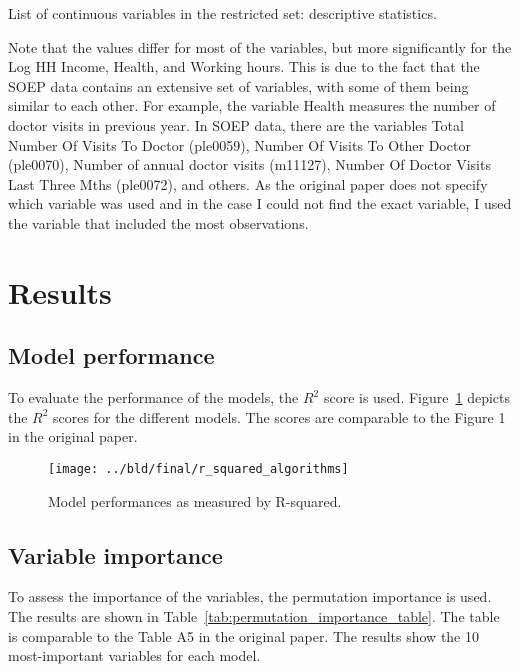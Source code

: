 \documentclass[11pt, a4paper, leqno]{article}
\begin{document}
\begin{table}[htbp]
    \centering
    
    \caption{List of continuous variables in the restricted set: descriptive statistics.}
    \label{tab:descriptive_stats_continuous}
\end{table}


Note that the values differ for most of the variables, but more significantly for the Log HH Income,
Health, and Working hours. This is due to the fact that the SOEP data contains an extensive
set of variables, with some of them being similar to each other. For example, the variable Health
measures the number of doctor visits in previous year. In SOEP data, there are the variables
Total Number Of Visits To Doctor (ple0059), Number Of Visits To Other Doctor (ple0070), Number of
annual doctor visits (m11127), Number Of Doctor Visits Last Three Mths (ple0072), and others.
As the original paper does not specify which variable was used and in the case I could not find
the exact variable, I used the variable that included the most observations.



\section{Results} %
\label{sec:results}

\subsection{Model performance}

To evaluate the performance of the models, the $R^2$ score is used. Figure~\ref{fig:r_squared_algorithms}
depicts the $R^2$ scores for the different models. The scores are comparable to the Figure 1 in the
original paper.

\begin{figure}[htbp]
    \centering
    \texttt{[image: ../bld/final/r\_squared\_algorithms]}
    \caption{Model performances as measured by R-squared.}
    \label{fig:r_squared_algorithms}
\end{figure}


\subsection{Variable importance}

To assess the importance of the variables, the permutation importance is used. The results are
shown in Table~\ref{tab:permutation_importance_table}. The table is comparable to the Table A5 in
the original paper. The results show the 10 most-important variables for each model.
\end{document}
